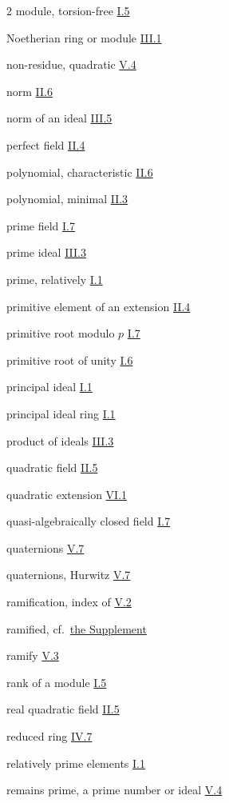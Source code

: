 \begin{multicols}{2}
module, torsion-free \hyperref[sec:1.5]{I.5}

\medskip
Noetherian ring or module \hyperref[sec:3.1]{III.1}

non-residue, quadratic \hyperref[sec:5.4]{V.4}

norm \hyperref[sec:2.6]{II.6}

norm of an ideal \hyperref[sec:3.5]{III.5}

\medskip
perfect field \hyperref[sec:2.4]{II.4}

polynomial, characteristic \hyperref[sec:2.6]{II.6}

polynomial, minimal \hyperref[sec:2.3]{II.3}

prime field \hyperref[sec:1.7]{I.7}

prime ideal \hyperref[sec:3.3]{III.3}

prime, relatively \hyperref[sec:1.1]{I.1}

primitive element of an extension \hyperref[sec:2.4]{II.4}

primitive root modulo $p$ \hyperref[sec:1.7]{I.7}

primitive root of unity \hyperref[sec:1.6]{I.6}

principal ideal \hyperref[sec:1.1]{I.1}

principal ideal ring \hyperref[sec:1.1]{I.1}

product of ideals \hyperref[sec:3.3]{III.3}

\medskip
quadratic field \hyperref[sec:2.5]{II.5}

quadratic extension \hyperref[sec:6.1]{VI.1}

quasi-algebraically closed field \hyperref[sec:1.7]{I.7}

quaternions \hyperref[sec:5.7]{V.7}

quaternions, Hurwitz \hyperref[sec:5.7]{V.7}

\medskip
ramification, index of \hyperref[sec:5.2]{V.2}

ramified, cf.\ \hyperref[fm:supplement]{the Supplement}

ramify \hyperref[sec:5.3]{V.3}

rank of a module \hyperref[sec:1.5]{I.5}

real quadratic field \hyperref[sec:2.5]{II.5}

reduced ring \hyperref[sec:4.7]{IV.7}

relatively prime elements \hyperref[sec:1.1]{I.1}

remains prime, a prime number or ideal \hyperref[sec:5.4]{V.4}


\end{multicols}
